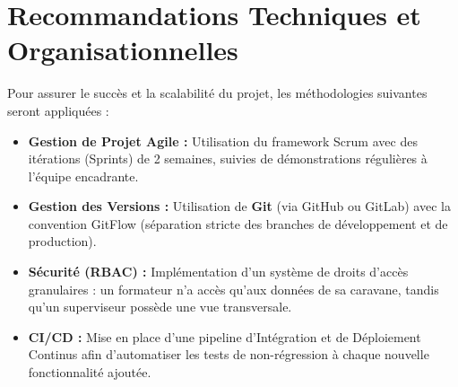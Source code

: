 \documentclass[12pt,a4paper]{article}
\begin{document}
\section{Recommandations Techniques et Organisationnelles}
Pour assurer le succès et la scalabilité du projet, les méthodologies suivantes seront appliquées :
\begin{itemize}
    \item \textbf{Gestion de Projet Agile :} Utilisation du framework Scrum avec des itérations (Sprints) de 2 semaines, suivies de démonstrations régulières à l'équipe encadrante.
    \item \textbf{Gestion des Versions :} Utilisation de \textbf{Git} (via GitHub ou GitLab) avec la convention GitFlow (séparation stricte des branches de développement et de production).
    \item \textbf{Sécurité (RBAC) :} Implémentation d'un système de droits d'accès granulaires : un formateur n'a accès qu'aux données de sa caravane, tandis qu'un superviseur possède une vue transversale.
    \item \textbf{CI/CD :} Mise en place d'une pipeline d'Intégration et de Déploiement Continus afin d'automatiser les tests de non-régression à chaque nouvelle fonctionnalité ajoutée.
\end{itemize}
\end{document}
